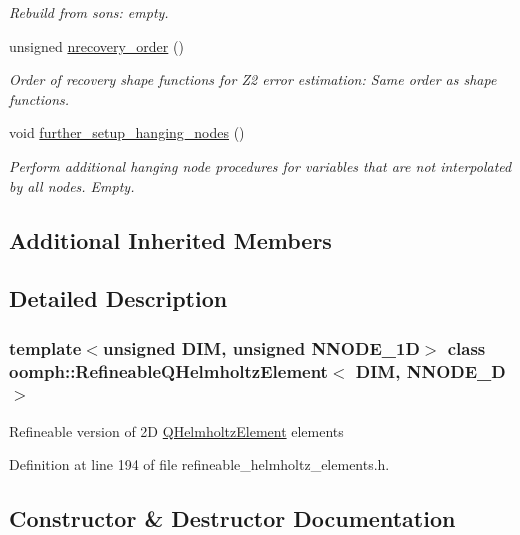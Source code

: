 \begin{DoxyCompactItemize}
\begin{DoxyCompactList}\small\item\em Rebuild from sons\+: empty. \end{DoxyCompactList}\item 
unsigned \hyperlink{classoomph_1_1RefineableQHelmholtzElement_ab5156aa04802c1bea18173abbe94cc20}{nrecovery\+\_\+order} ()
\begin{DoxyCompactList}\small\item\em Order of recovery shape functions for Z2 error estimation\+: Same order as shape functions. \end{DoxyCompactList}\item 
void \hyperlink{classoomph_1_1RefineableQHelmholtzElement_ad277724e5c77c731d782615de8a95094}{further\+\_\+setup\+\_\+hanging\+\_\+nodes} ()
\begin{DoxyCompactList}\small\item\em Perform additional hanging node procedures for variables that are not interpolated by all nodes. Empty. \end{DoxyCompactList}\end{DoxyCompactItemize}
\subsection*{Additional Inherited Members}


\subsection{Detailed Description}
\subsubsection*{template$<$unsigned D\+IM, unsigned N\+N\+O\+D\+E\+\_\+1D$>$\newline
class oomph\+::\+Refineable\+Q\+Helmholtz\+Element$<$ D\+I\+M, N\+N\+O\+D\+E\+\_\+D $>$}

Refineable version of 2D \hyperlink{classoomph_1_1QHelmholtzElement}{Q\+Helmholtz\+Element} elements 

Definition at line 194 of file refineable\+\_\+helmholtz\+\_\+elements.\+h.



\subsection{Constructor \& Destructor Documentation}
\mbox{\label{classoomph_1_1RefineableQHelmholtzElement_a12ca9c1fed325bcb2428fe0898a58212}} 
